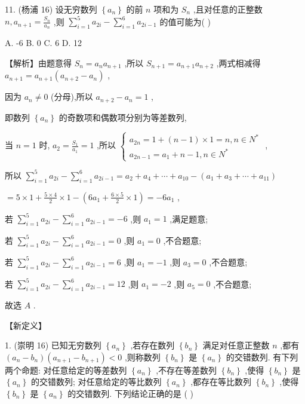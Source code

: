 \documentclass[10pt]{article}
\newcommand*\circled[1]{\tikz[baseline=(char.base)]{\node[shape=circle,draw,inner sep=1.5pt] (char) {\small #1};}}
\begin{document}
11. (杨浦 16) 设无穷数列 \(\left\{  {a}_{n}\right\}\) 的前 \(n\) 项和为 \({S}_{n}\) ,且对任意的正整数 \(n,{a}_{n + 1} = \frac{{S}_{n}}{{a}_{n}}\) ,则 \(\mathop{\sum }\limits_{{i = 1}}^{5}{a}_{2i} - \mathop{\sum }\limits_{{i = 1}}^{6}{a}_{{2i} - 1}\) 的值可能为(   )

A. -6 B. 0 C. 6 D. 12

【解析】由题意得 \({S}_{n} = {a}_{n}{a}_{n + 1}\) ,所以 \({S}_{n + 1} = {a}_{n + 1}{a}_{n + 2}\) ,两式相减得 \({a}_{n + 1} = {a}_{n + 1}\left( {{a}_{n + 2} - {a}_{n}}\right)\) ,

因为 \({a}_{n} \neq  0\) (分母),所以 \({a}_{n + 2} - {a}_{n} = 1\) ,

即数列 \(\left\{  {a}_{n}\right\}\) 的奇数项和偶数项分别为等差数列,

当 \(n = 1\) 时, \({a}_{2} = \frac{{S}_{1}}{{a}_{1}} = 1\) ,所以 \(\left\{  \begin{array}{l} {a}_{2n} = 1 + \left( {n - 1}\right)  \times  1 = n,n \in  {N}^{ * } \\  {a}_{{2n} - 1} = {a}_{1} + n - 1,n \in  {N}^{ * } \end{array}\right.\) ,

所以 \(\mathop{\sum }\limits_{{i = 1}}^{5}{a}_{2i} - \mathop{\sum }\limits_{{i = 1}}^{6}{a}_{{2i} - 1} = {a}_{2} + {a}_{4} + \cdots  + {a}_{10} - \left( {{a}_{1} + {a}_{3} + \cdots  + {a}_{11}}\right)\)

\(= 5 \times  1 + \frac{5 \times  4}{2} \times  1 - \left( {6{a}_{1} + \frac{6 \times  5}{2} \times  1}\right)  =  - 6{a}_{1}\) ,

若 \(\mathop{\sum }\limits_{{i = 1}}^{5}{a}_{2i} - \mathop{\sum }\limits_{{i = 1}}^{6}{a}_{{2i} - 1} =  - 6\) ,则 \({a}_{1} = 1\) ,满足题意;

若 \(\mathop{\sum }\limits_{{i = 1}}^{5}{a}_{2i} - \mathop{\sum }\limits_{{i = 1}}^{6}{a}_{{2i} - 1} = 0\) ,则 \({a}_{1} = 0\) ,不合题意;

若 \(\mathop{\sum }\limits_{{i = 1}}^{5}{a}_{2i} - \mathop{\sum }\limits_{{i = 1}}^{6}{a}_{{2i} - 1} = 6\) ,则 \({a}_{1} =  - 1\) ,则 \({a}_{3} = 0\) ,不合题意;

若 \(\mathop{\sum }\limits_{{i = 1}}^{5}{a}_{2i} - \mathop{\sum }\limits_{{i = 1}}^{6}{a}_{{2i} - 1} = {12}\) ,则 \({a}_{1} =  - 2\) ,则 \({a}_{5} = 0\) ,不合题意;

故选 \(A\) .

【新定义】

1. (崇明 16) 已知无穷数列 \(\left\{  {a}_{n}\right\}\) ,若存在数列 \(\left\{  {b}_{n}\right\}\) 满足对任意正整数 \(n\) ,都有 \(\left( {{a}_{n} - {b}_{n}}\right) \left( {{a}_{n + 1} - {b}_{n + 1}}\right)  < 0\) ,则称数列 \(\left\{  {b}_{n}\right\}\) 是 \(\left\{  {a}_{n}\right\}\) 的交错数列. 有下列两个命题:  \circled{1} 对任意给定的等差数列 \(\left\{  {a}_{n}\right\}\) ,不存在等差数列 \(\left\{  {b}_{n}\right\}\) ,使得 \(\left\{  {b}_{n}\right\}\) 是 \(\left\{  {a}_{n}\right\}\) 的交错数列;  \circled{2} 对任意给定的等比数列 \(\left\{  {a}_{n}\right\}\) ,都存在等比数列 \(\left\{  {b}_{n}\right\}\) ,使得 \(\left\{  {b}_{n}\right\}\) 是 \(\left\{  {a}_{n}\right\}\) 的交错数列. 下列结论正确的是 ( )
\end{document}
